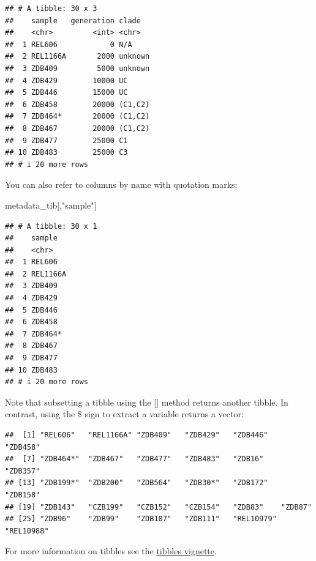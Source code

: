 \documentclass[
]{book}
\newenvironment{Shaded}{\begin{snugshade}}{\end{snugshade}}
\newcommand{\NormalTok}[1]{#1}
\newcommand{\SpecialCharTok}[1]{\textcolor[rgb]{0.81,0.36,0.00}{\textbf{#1}}}
\newcommand{\StringTok}[1]{\textcolor[rgb]{0.31,0.60,0.02}{#1}}
\begin{document}
\begin{verbatim}
## # A tibble: 30 x 3
##    sample   generation clade  
##    <chr>         <int> <chr>  
##  1 REL606            0 N/A    
##  2 REL1166A       2000 unknown
##  3 ZDB409         5000 unknown
##  4 ZDB429        10000 UC     
##  5 ZDB446        15000 UC     
##  6 ZDB458        20000 (C1,C2)
##  7 ZDB464*       20000 (C1,C2)
##  8 ZDB467        20000 (C1,C2)
##  9 ZDB477        25000 C1     
## 10 ZDB483        25000 C3     
## # i 20 more rows
\end{verbatim}

You can also refer to columns by name with quotation marks:

\begin{Shaded}
\begin{Highlighting}[]
\NormalTok{metadata\_tib[,}\StringTok{"sample"}\NormalTok{]}
\end{Highlighting}
\end{Shaded}

\begin{verbatim}
## # A tibble: 30 x 1
##    sample  
##    <chr>   
##  1 REL606  
##  2 REL1166A
##  3 ZDB409  
##  4 ZDB429  
##  5 ZDB446  
##  6 ZDB458  
##  7 ZDB464* 
##  8 ZDB467  
##  9 ZDB477  
## 10 ZDB483  
## # i 20 more rows
\end{verbatim}

Note that subsetting a tibble using the {[}{]} method returns another tibble. In contrast, using the \$ sign to extract a variable returns a vector:

\begin{Shaded}
\end{Shaded}

\begin{verbatim}
##  [1] "REL606"   "REL1166A" "ZDB409"   "ZDB429"   "ZDB446"   "ZDB458"  
##  [7] "ZDB464*"  "ZDB467"   "ZDB477"   "ZDB483"   "ZDB16"    "ZDB357"  
## [13] "ZDB199*"  "ZDB200"   "ZDB564"   "ZDB30*"   "ZDB172"   "ZDB158"  
## [19] "ZDB143"   "CZB199"   "CZB152"   "CZB154"   "ZDB83"    "ZDB87"   
## [25] "ZDB96"    "ZDB99"    "ZDB107"   "ZDB111"   "REL10979" "REL10988"
\end{verbatim}

For more information on tibbles see the \href{https://cran.r-project.org/web/packages/tibble/vignettes/tibble.html}{tibbles vignette}.
\end{document}
